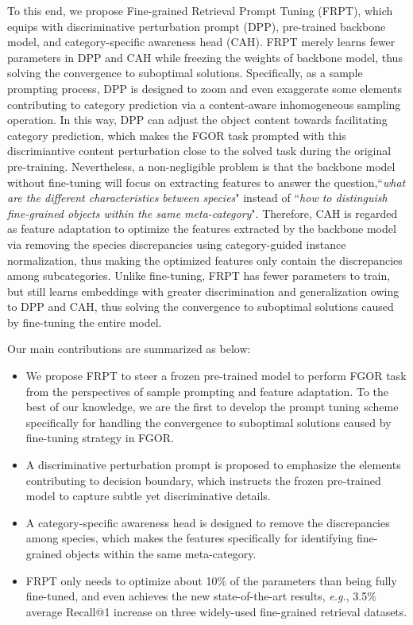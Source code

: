 \documentclass[letterpaper]{article} %
\begin{document}
To this end, we propose Fine-grained Retrieval Prompt Tuning (FRPT), which equips with  discriminative perturbation prompt (DPP), pre-trained backbone model, and category-specific awareness head (CAH).
FRPT merely learns fewer parameters in DPP and CAH while freezing the weights of backbone model, thus solving the convergence to suboptimal solutions.
Specifically, as a sample prompting process, DPP is designed to zoom and even exaggerate some elements contributing to category prediction via a content-aware inhomogeneous sampling operation.
In this way, DPP can adjust the object content towards facilitating category prediction, which makes the FGOR task prompted with this discrimiantive content perturbation close to the solved task during the original pre-training.
Nevertheless, a non-negligible problem is that the backbone model without fine-tuning will focus on extracting features to answer the question,``{\it what are the different characteristics between species}" instead of ``{\it how to distinguish fine-grained objects within the same meta-category}".
Therefore, CAH is regarded as feature adaptation to optimize the features extracted by the backbone model via removing the species discrepancies using category-guided instance normalization, thus making the optimized features only contain the discrepancies among subcategories.
Unlike fine-tuning, FRPT has fewer parameters to train, but still learns embeddings with greater discrimination and generalization owing to DPP and CAH, thus solving the convergence to suboptimal solutions caused by fine-tuning the entire model.









Our main contributions are summarized as below:
\begin{itemize}
    \item  We propose FRPT to steer a frozen pre-trained model to perform FGOR task from the perspectives of sample prompting and feature adaptation. To the best of our knowledge, we are the first to develop the prompt tuning scheme specifically for handling the convergence to suboptimal solutions caused by fine-tuning strategy in FGOR.

 \item A discriminative perturbation prompt is proposed to emphasize the elements contributing to decision boundary, which instructs the frozen pre-trained model to capture subtle yet discriminative details.

\item A category-specific awareness head is designed to remove the discrepancies among species, which makes the features specifically for identifying fine-grained objects within the same meta-category.


\item FRPT only needs to optimize about 10\% of the parameters than being fully fine-tuned, and even achieves the new state-of-the-art results, {\it e.g.}, 3.5\% average Recall@1 increase on three widely-used fine-grained retrieval datasets.
\end{itemize}
\end{document}
